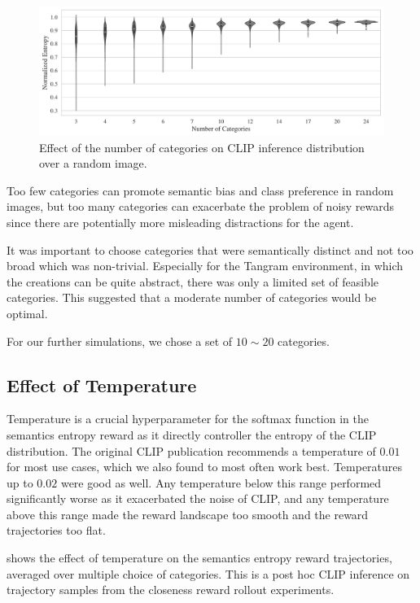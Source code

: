 \begin{figure}[h]
    \centering
    \includegraphics[width=\textwidth]{images/category_comparison_tangram.pdf}
    \caption{Effect of the number of categories on CLIP inference distribution over a random image.}
    \label{fig:clip-categories}
\end{figure}

Too few categories can promote semantic bias and class preference in random images, but too many categories can exacerbate the problem of noisy rewards since there are potentially more misleading distractions for the agent.

It was important to choose categories that were semantically distinct and not too broad which was non-trivial.
Especially for the Tangram environment, in which the creations can be quite abstract, there was only a limited set of feasible categories.
This suggested that a moderate number of categories would be optimal.

For our further simulations, we chose a set of \(10 \sim 20\) categories.

\subsection{Effect of Temperature}
\label{sec:reg-temperature}

Temperature is a crucial hyperparameter for the softmax function in the semantics entropy reward as it directly controller the entropy of the CLIP distribution.
The original CLIP publication recommends a temperature of \(0.01\) for most use cases, which we also found to most often work best.
Temperatures up to \(0.02\) were good as well.
Any temperature below this range performed significantly worse as it exacerbated the noise of CLIP, and any temperature above this range made the reward landscape too smooth and the reward trajectories too flat.

 shows the effect of temperature on the semantics entropy reward trajectories, averaged over multiple choice of categories.
This is a post hoc CLIP inference on trajectory samples from the closeness reward rollout experiments.

